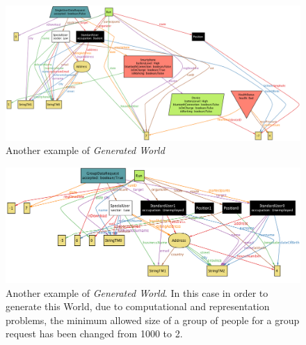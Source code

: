  \begin{figure}[H]
 \begin{center}
   \includegraphics[width=\textwidth]{./img/alloy/alloy5.png}
   \hspace{0.05\linewidth}
   \centering
   \caption{Another example of \textit{Generated World}}
   \label{img:generatedWorld3}
 \end{center}
 \end{figure}

 \begin{figure}[H]
 \begin{center}
   \includegraphics[width=\textwidth]{./img/alloy/alloy6.png}
   \hspace{0.05\linewidth}
   \centering
   \caption{Another example of \textit{Generated World}. In this case in order to generate this World, due to computational and representation problems, the minimum allowed size of a group of people for a group request has been changed from 1000 to 2.}
   \label{img:generatedWorld4}
 \end{center}
 \end{figure}
\clearpage

